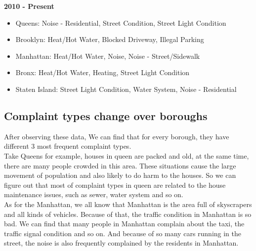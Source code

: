\documentclass[sigconf]{acmart}
\begin{document}
\textbf{2010 - Present}
\begin{itemize}
    \item Queens: Noise - Residential, Street Condition, Street Light Condition
    \item Brooklyn: Heat/Hot Water, Blocked Driveway, Illegal Parking
    \item Manhattan: Heat/Hot Water, Noise, Noise - Street/Sidewalk
    \item Bronx: Heat/Hot Water, Heating, Street Light Condition
    \item Staten Island: Street Light Condition, Water System, Noise - Residential
\end{itemize}


\subsection{Complaint types change over boroughs}
After observing these data, We can find that for every borough, they have different 3 most frequent complaint types. \\ 
Take Queens for example, houses in queen are packed and old, at the same time, there are many people crowded in this area. These situations cause the large movement of population and also likely to do harm to the houses. So we can figure out that most of complaint types in queen are related to the house maintenance issues, such as sewer, water system and so on.\\
As for the Manhattan, we all know that Manhattan is the area full of skyscrapers and all kinds of vehicles. Because of that, the traffic condition in Manhattan is so bad. We can find that many people in Manhattan complain about the taxi, the traffic signal condition and so on. And because of so many cars running in the street, the noise is also frequently complained by the residents in Manhattan.
\end{document}
